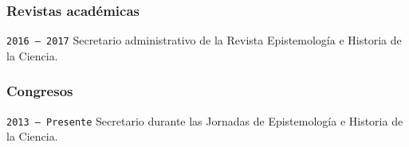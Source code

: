 \documentclass[]{article}
\begin{document}
\hypertarget{revistas-acaduxe9micas}{%
\subsubsection{Revistas académicas}\label{revistas-acaduxe9micas}}

\texttt{2016\ –\ 2017} Secretario administrativo de la Revista
Epistemología e Historia de la Ciencia.

\hypertarget{congresos}{%
\subsubsection{Congresos}\label{congresos}}

\texttt{2013\ –\ Presente} Secretario durante las Jornadas de
Epistemología e Historia de la Ciencia.
\end{document}
